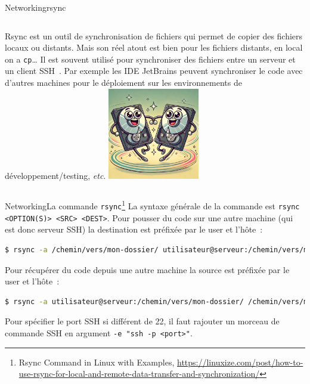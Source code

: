 \documentclass{beamer}
\begin{document}
    \begin{frame}{Networking}{rsync}
        \begin{columns}
            Rsync est un outil de synchronisation de fichiers qui permet de copier des fichiers locaux ou distants.
            Mais son réel atout est bien pour les fichiers distants, en local on a \lstinline{cp}\ldots
            \bigbreak
            Il est souvent utilisé pour synchroniser des fichiers entre un serveur et un client SSH~.
            \bigbreak
            Par exemple les IDE JetBrains peuvent synchroniser le code avec d'autres machines pour le déploiement sur les environnements de développement/testing, \textit{etc}.
            \centering
            \includegraphics[width=4cm]{image/hdd-synchronous}
        \end{columns}
    \end{frame}

    \begin{frame}[fragile]{Networking}{La commande \lstinline{rsync}\footnote{Rsync Command in Linux with Examples, \url{https://linuxize.com/post/how-to-use-rsync-for-local-and-remote-data-transfer-and-synchronization/}}}
        La syntaxe générale de la commande est \lstinline{rsync <OPTION(S)> <SRC> <DEST>}.
        Pour pousser du code sur une autre machine (qui est donc serveur SSH) la destination est préfixée par le user et l'hôte~:
        \bigbreak
        \begin{lstlisting}[language=bash]
$ rsync -a /chemin/vers/mon-dossier/ utilisateur@serveur:/chemin/vers/mon-dossier/
        \end{lstlisting}
        Pour récupérer du code depuis une autre machine la source est préfixée par le user et l'hôte~:
        \begin{lstlisting}[language=bash]
$ rsync -a utilisateur@serveur:/chemin/vers/mon-dossier/ /chemin/vers/mon-dossier/
        \end{lstlisting}
        Pour spécifier le port SSH si différent de 22, il faut rajouter un morceau de commande SSH en argument \lstinline{-e "ssh -p <port>"}.
    \end{frame}
\end{document}
